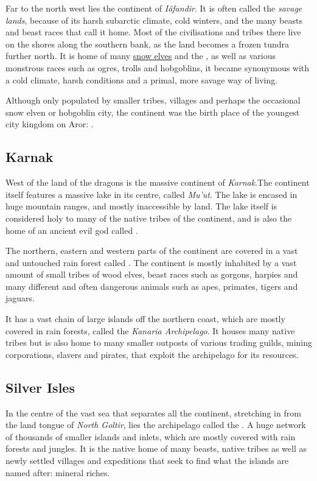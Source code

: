 Far to the north west lies the continent of \emph{Iâfandir}. It is often
called the \emph{savage lands}, because of its harsh subarctic climate, cold
winters, and the many beasts and beast races that call it home. Most of the
civilisations and tribes there live on the shores along the southern bank, as
the land becomes a frozen tundra further north. It is home of many
\hyperref[sec:Snow Elves]{snow elves} and the , as well as
various monstrous races such as ogres, trolls and hobgoblins, it became
synonymous with a cold climate, harsh conditions and a primal, more savage way
of living.

Although only populated by smaller tribes, villages and perhaps the occasional
snow elven or hobgoblin city, the continent was the birth place of the youngest
city kingdom on Aror: .

\subsection{Karnak}
\label{sec:Karnak}

West of the land of the dragons is the massive continent of \emph{Karnak}.The
continent itself features a massive lake in its centre, called \emph{Mu'ut}.
The lake is encased in huge mountain ranges, and mostly inaccessible by
land. The lake itself is considered holy to many of the native tribes of the
continent, and is also the home of an ancient evil god called
.

The northern, eastern and western parts of the continent are covered in a vast
and untouched rain forest called . The continent is
mostly inhabited by a vast amount of small tribes of wood elves, beast races
such as gorgons, harpies and many different and often dangerous animals such
as apes, primates, tigers and jaguars.

It has a vast chain of large islands off the northern coast, which are mostly
covered in rain forests, called the \emph{Kanaria Archipelago}. It houses many
native tribes but is also home to many smaller outposts of various trading
guilds, mining corporations, slavers and pirates, that exploit the archipelago
for its resources.

\subsection{Silver Isles}

In the centre of the vast sea that separates all the continent, stretching in
from the land tongue of \emph{North Goltir}, lies the archipelago called the
. A huge network of thousands of smaller islands and
inlets, which are mostly covered with rain forests and jungles. It is the
native home of many beasts, native tribes as well as newly settled villages
and expeditions that seek to find what the islands are named after: mineral
riches.
